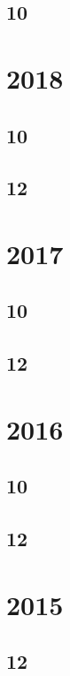 \documentclass[11pt]{book}
\begin{document}
\subsection{10}

\section{2018}
\subsection{10}


\subsection{12}




\section{2017}
\subsection{10}

\subsection{12}








\section{2016}
\subsection{10}

\subsection{12}


\section{2015}
\subsection{12}

\end{document}

